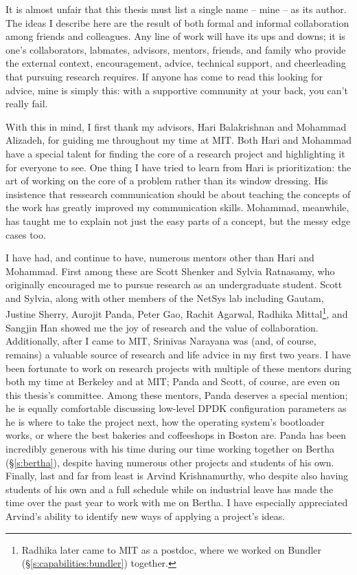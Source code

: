 It is almost unfair that this thesis must list a single name -- \ie mine -- as its author. The ideas I describe here are the result of both formal and informal collaboration among friends and colleagues.
Any line of work will have its ups and downs; it is one's collaborators, labmates, advisors, mentors, friends, and family who provide the external context, encouragement, advice, technical support, and cheerleading that pursuing research requires. 
If anyone has come to read this looking for advice, mine is simply this: with a supportive community at your back, you can't really fail.

With this in mind, I first thank my advisors, Hari Balakrishnan and Mohammad Alizadeh, for guiding me throughout my time at MIT. Both Hari and Mohammad have a special talent for finding the core of a research project and highlighting it for everyone to see. 
One thing I have tried to learn from Hari is prioritization: the art of working on the core of a problem rather than its window dressing.
His insistence that ressearch communication should be about teaching the concepts of the work has greatly improved my communication skills.
Mohammad, meanwhile, has taught me to explain not just the easy parts of a concept, but the messy edge cases too.

I have had, and continue to have, numerous mentors other than Hari and Mohammad. First among these are Scott Shenker and Sylvia Ratnasamy, who originally encouraged me to pursue research as an undergraduate student. Scott and Sylvia, along with other members of the NetSys lab including Gautam, Justine Sherry, Aurojit Panda, Peter Gao, Rachit Agarwal, Radhika Mittal\footnote{Radhika later came to MIT as a postdoc, where we worked on Bundler (\S\ref{s:capabilities:bundler}) together.}, and Sangjin Han showed me the joy of research and the value of collaboration. 
Additionally, after I came to MIT, Srinivas Narayana was (and, of course, remains) a valuable source of research and life advice in my first two years.
I have been fortunate to work on research projects with multiple of these mentors during both my time at Berkeley and at MIT; Panda and Scott, of course, are even on this thesis's committee.
Among these mentors, Panda deserves a special mention; he is equally comfortable discussing low-level DPDK configuration parameters as he is where to take the project next, how the operating system's bootloader works, or where the best bakeries and coffeeshops in Boston are. 
Panda has been incredibly generous with his time during our time working together on Bertha (\S\ref{s:bertha}), despite having numerous other projects and students of his own.
Finally, last and far from least is Arvind Krishnamurthy, who despite also having students of his own and a full schedule while on industrial leave has made the time over the past year to work with me on Bertha. I have especially appreciated Arvind's ability to identify new ways of applying a project's ideas.

